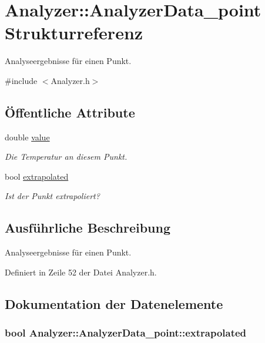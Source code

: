\hypertarget{structAnalyzer_1_1AnalyzerData__point}{\section{Analyzer\-:\-:Analyzer\-Data\-\_\-point Strukturreferenz}
\label{structAnalyzer_1_1AnalyzerData__point}
}


Analyseergebnisse für einen Punkt.  




{\ttfamily \#include $<$Analyzer.\-h$>$}

\subsection*{Öffentliche Attribute}
\begin{DoxyCompactItemize}
\item 
double \hyperlink{structAnalyzer_1_1AnalyzerData__point_a150b00a3d0be5d1c75b39292d213cbfa}{value}
\begin{DoxyCompactList}\small\item\em Die Temperatur an diesem Punkt. \end{DoxyCompactList}\item 
bool \hyperlink{structAnalyzer_1_1AnalyzerData__point_af4d2c2bd41aebc3c243afc5544bed81a}{extrapolated}
\begin{DoxyCompactList}\small\item\em Ist der Punkt extrapoliert? \end{DoxyCompactList}\end{DoxyCompactItemize}


\subsection{Ausführliche Beschreibung}
Analyseergebnisse für einen Punkt. 

Definiert in Zeile 52 der Datei Analyzer.\-h.



\subsection{Dokumentation der Datenelemente}
\hypertarget{structAnalyzer_1_1AnalyzerData__point_af4d2c2bd41aebc3c243afc5544bed81a}{
\subsubsection[{extrapolated}]{\setlength{\rightskip}{0pt plus 5cm}bool Analyzer\-::\-Analyzer\-Data\-\_\-point\-::extrapolated}}\label{structAnalyzer_1_1AnalyzerData__point_af4d2c2bd41aebc3c243afc5544bed81a}


